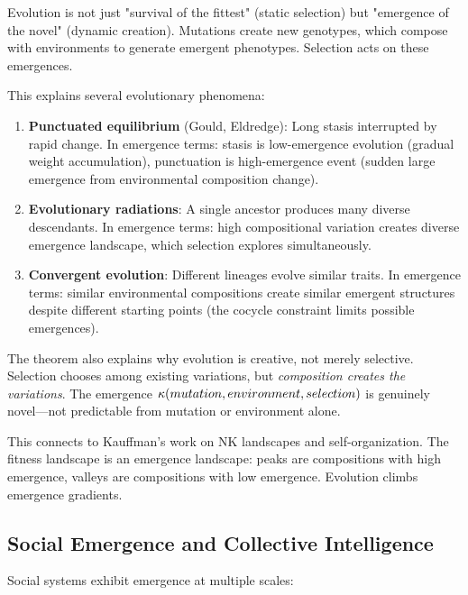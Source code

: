 \begin{interpretation}
Evolution is not just "survival of the fittest" (static selection) but
"emergence of the novel" (dynamic creation). Mutations create new genotypes,
which compose with environments to generate emergent phenotypes. Selection acts
on these emergences.

This explains several evolutionary phenomena:
\begin{enumerate}
  \item \textbf{Punctuated equilibrium} (Gould, Eldredge): Long stasis interrupted
    by rapid change. In emergence terms: stasis is low-emergence evolution
    (gradual weight accumulation), punctuation is high-emergence event (sudden
    large emergence from environmental composition change).
  
  \item \textbf{Evolutionary radiations}: A single ancestor produces many diverse
    descendants. In emergence terms: high compositional variation creates diverse
    emergence landscape, which selection explores simultaneously.
  
  \item \textbf{Convergent evolution}: Different lineages evolve similar traits.
    In emergence terms: similar environmental compositions create similar emergent
    structures despite different starting points (the cocycle constraint limits
    possible emergences).
\end{enumerate}

The theorem also explains why evolution is creative, not merely selective.
Selection chooses among existing variations, but \emph{composition creates the
variations}. The emergence $\kappa(mutation, environment, selection)$ is
genuinely novel---not predictable from mutation or environment alone.

This connects to Kauffman's work on NK landscapes and self-organization. The
fitness landscape is an emergence landscape: peaks are compositions with high
emergence, valleys are compositions with low emergence. Evolution climbs emergence
gradients.
\end{interpretation}

\subsection{Social Emergence and Collective Intelligence}

Social systems exhibit emergence at multiple scales:

